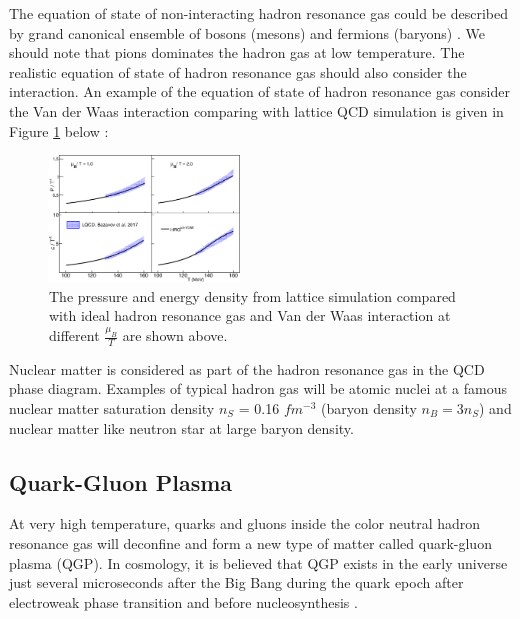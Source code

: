 The equation of state of non-interacting hadron resonance gas could be described by grand canonical ensemble of bosons (mesons) and fermions (baryons) \cite{StatMechHadron}. We should note that pions dominates the hadron gas at low temperature. The realistic equation of state of hadron resonance gas should also consider the interaction. An example of the equation of state of hadron resonance gas consider the Van der Waas interaction comparing with lattice QCD simulation is given in Figure \ref{EOSHadronLattice} below \cite{EOSHadron}:

\begin{figure}[hbtp]
\begin{center}
\includegraphics[width=0.45\textwidth]{Figures/Chapter1/EOSHadronGas.png}
\caption{The pressure and energy density from lattice simulation compared with ideal hadron resonance gas and Van der Waas interaction at different $\frac{\mu_B}{T}$ are shown above.}
\label{EOSHadronLattice}
\end{center}
\end{figure} 



Nuclear matter is considered as part of the hadron resonance gas in the QCD phase diagram. Examples of typical hadron gas will be atomic nuclei at a famous nuclear matter saturation density $n_S$ = 0.16 $fm^{-3}$ (baryon density $n_B = 3 n_S$) and nuclear matter like neutron star at large baryon density. 

\subsection{Quark-Gluon Plasma}

At very high temperature, quarks and gluons inside the color neutral hadron resonance gas will deconfine and form a new type of matter called quark-gluon plasma (QGP). In cosmology, it is believed that QGP exists in the early universe just several microseconds after the Big Bang during the quark epoch after electroweak phase transition and before nucleosynthesis \cite{QGPCosmology}. 



